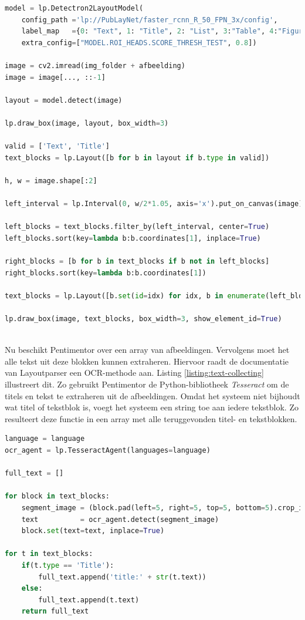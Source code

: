 \begin{lstlisting}[language=Python, caption={Een PDF inlezen met OCR}, label={listing:reader-ocr}]
model = lp.Detectron2LayoutModel(
	config_path ='lp://PubLayNet/faster_rcnn_R_50_FPN_3x/config',
	label_map   ={0: "Text", 1: "Title", 2: "List", 3:"Table", 4:"Figure"}, 
	extra_config=["MODEL.ROI_HEADS.SCORE_THRESH_TEST", 0.8])

image = cv2.imread(img_folder + afbeelding)
image = image[..., ::-1]
	
layout = model.detect(image)
	
lp.draw_box(image, layout, box_width=3)
	
valid = ['Text', 'Title']
text_blocks = lp.Layout([b for b in layout if b.type in valid])
	
h, w = image.shape[:2]
	
left_interval = lp.Interval(0, w/2*1.05, axis='x').put_on_canvas(image)
	
left_blocks = text_blocks.filter_by(left_interval, center=True)
left_blocks.sort(key=lambda b:b.coordinates[1], inplace=True)
	
right_blocks = [b for b in text_blocks if b not in left_blocks]
right_blocks.sort(key=lambda b:b.coordinates[1])
	
text_blocks = lp.Layout([b.set(id=idx) for idx, b in enumerate(left_blocks+right_blocks)])
	
lp.draw_box(image, text_blocks, box_width=3, show_element_id=True)
	
\end{lstlisting}

Nu beschikt Pentimentor over een array van afbeeldingen. Vervolgens moet het alle tekst uit deze blokken kunnen extraheren. Hiervoor raadt de documentatie van Layoutparser een OCR-methode aan. Listing \ref{listing:text-collecting} illustreert dit. Zo gebruikt Pentimentor de Python-bibliotheek \textit{Tesseract} om de titels en tekst te extraheren uit de afbeeldingen. Omdat het systeem niet bijhoudt wat titel of tekstblok is, voegt het systeem een string toe aan iedere tekstblok. Zo resulteert deze functie in een array met alle teruggevonden titel- en tekstblokken.

\begin{lstlisting}[language=Python, caption={Tekst extraheren uit de geparsete inhoud.}, label={listing:text-collecting}]
language = language
ocr_agent = lp.TesseractAgent(languages=language)

full_text = []
	
for block in text_blocks:
	segment_image = (block.pad(left=5, right=5, top=5, bottom=5).crop_image(image))
	text          = ocr_agent.detect(segment_image)
	block.set(text=text, inplace=True)
	
for t in text_blocks:
	if(t.type == 'Title'):
		full_text.append('title:' + str(t.text))
	else:
		full_text.append(t.text)    
	return full_text
    
\end{lstlisting}

